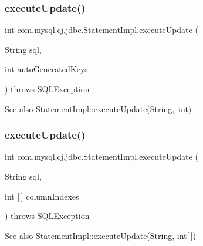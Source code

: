 \subsubsection{\texorpdfstring{execute\+Update()}{executeUpdate()}\hspace{0.1cm}{\footnotesize\ttfamily [2/4]}}
{\footnotesize\ttfamily int com.\+mysql.\+cj.\+jdbc.\+Statement\+Impl.\+execute\+Update (\begin{DoxyParamCaption}\item[{String}]{sql,  }\item[{int}]{auto\+Generated\+Keys }\end{DoxyParamCaption}) throws S\+Q\+L\+Exception}

\begin{DoxySeeAlso}{See also}
\mbox{\hyperlink{classcom_1_1mysql_1_1cj_1_1jdbc_1_1_statement_impl_a17446c85d153a1456965eb64858b5f46}{Statement\+Impl\+::execute\+Update(\+String, int)}} 
\end{DoxySeeAlso}
\mbox{\label{classcom_1_1mysql_1_1cj_1_1jdbc_1_1_statement_impl_a2ff60b126d55ceb7d991c9d5f56cebb6}} 
\subsubsection{\texorpdfstring{execute\+Update()}{executeUpdate()}\hspace{0.1cm}{\footnotesize\ttfamily [3/4]}}
{\footnotesize\ttfamily int com.\+mysql.\+cj.\+jdbc.\+Statement\+Impl.\+execute\+Update (\begin{DoxyParamCaption}\item[{String}]{sql,  }\item[{int \mbox{[}$\,$\mbox{]}}]{column\+Indexes }\end{DoxyParamCaption}) throws S\+Q\+L\+Exception}

\begin{DoxySeeAlso}{See also}
Statement\+Impl\+::execute\+Update(\+String, int\mbox{[}$\,$\mbox{]}) 
\end{DoxySeeAlso}
\mbox{\label{classcom_1_1mysql_1_1cj_1_1jdbc_1_1_statement_impl_ad715518d5ddeca0a3a8771646c467d0b}} 
